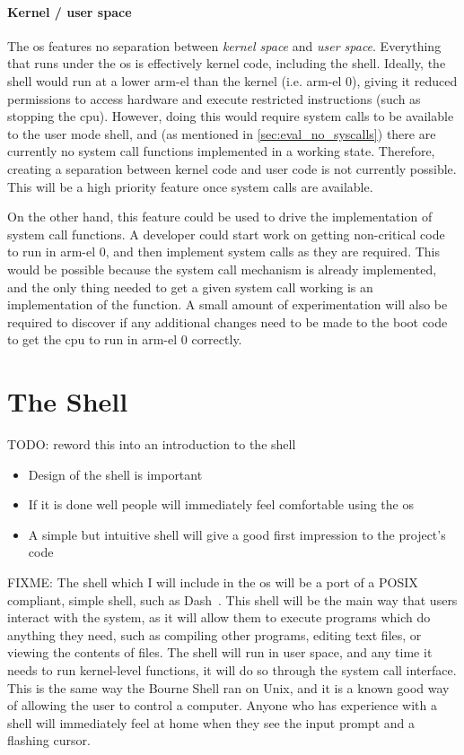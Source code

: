 \documentclass{article}
\begin{document}
\paragraph{Kernel / user space}
The \gls{os} features no separation between \emph{kernel space} and \emph{user
space}. Everything that runs under the \gls{os} is effectively kernel code,
including the shell. Ideally, the shell would run at a lower \gls{arm-el} than
the kernel (i.e. \gls{arm-el} 0), giving it reduced permissions to access
hardware and execute restricted instructions (such as stopping the \gls{cpu}).
However, doing this would require system calls to be available to the user mode
shell, and (as mentioned in \autoref{sec:eval_no_syscalls}) there are currently
no system call functions implemented in a working state. Therefore, creating a
separation between kernel code and user code is not currently possible. This
will be a high priority feature once system calls are available.

On the other hand, this feature could be used to drive the implementation of
system call functions. A developer could start work on getting non-critical
code to run in \gls{arm-el} 0, and then implement system calls as they are
required. This would be possible because the system call mechanism is already
implemented, and the only thing needed to get a given system call working is an
implementation of the function. A small amount of experimentation will also be
required to discover if any additional changes need to be made to the boot code
to get the \gls{cpu} to run in \gls{arm-el} 0 correctly.

\section{The Shell}
TODO: reword this into an introduction to the shell

\begin{itemize}
    \item Design of the shell is important
    \item If it is done well people will immediately feel comfortable using the
        \gls{os}
    \item A simple but intuitive shell will give a good first impression to the
        project's code
\end{itemize}

FIXME:
The shell which I will include in the \gls{os} will be a port of a POSIX
compliant, simple shell, such as Dash~\cite{dash-shell}. This shell will be the
main way that users interact with the system, as it will allow them to execute
programs which do anything they need, such as compiling other programs, editing
text files, or viewing the contents of files. The shell will run in user space,
and any time it needs to run kernel-level functions, it will do so through the
system call interface. This is the same way the Bourne Shell ran on Unix, and
it is a known good way of allowing the user to control a computer. Anyone who
has experience with a shell will immediately feel at home when they see the
input prompt and a flashing cursor.
\end{document}
